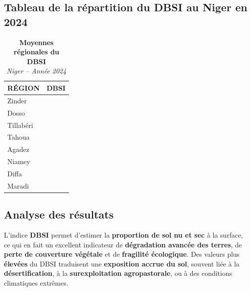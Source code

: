 \documentclass[
]{book}
\begin{document}
\subsection{Tableau de la répartition du DBSI au Niger en 2024}\label{tableau-de-la-ruxe9partition-du-dbsi-au-niger-en-2024}

\begin{table}[!t]
\caption*{
{\large \textbf{Moyennes régionales du DBSI}} \\ 
{\small \emph{Niger -- Année 2024}}
} 
\fontsize{12.0pt}{14.4pt}\selectfont
\begin{tabular*}{\linewidth}{@{\extracolsep{\fill}}lr}
\toprule
{RÉGION} & {DBSI} \\ 
\midrule\addlinespace[2.5pt]
Zinder & {\cellcolor[HTML]{FDC2AA}{\textcolor[HTML]{000000}{0.238}}} \\ 
Dosso & {\cellcolor[HTML]{DB2A24}{\textcolor[HTML]{FFFFFF}{0.273}}} \\ 
Tillabéri & {\cellcolor[HTML]{810511}{\textcolor[HTML]{FFFFFF}{0.292}}} \\ 
Tahoua & {\cellcolor[HTML]{D72622}{\textcolor[HTML]{FFFFFF}{0.274}}} \\ 
Agadez & {\cellcolor[HTML]{C0151B}{\textcolor[HTML]{FFFFFF}{0.280}}} \\ 
Niamey & {\cellcolor[HTML]{67000D}{\textcolor[HTML]{FFFFFF}{0.296}}} \\ 
Diffa & {\cellcolor[HTML]{FFF5F0}{\textcolor[HTML]{000000}{0.221}}} \\ 
Maradi & {\cellcolor[HTML]{FC7A59}{\textcolor[HTML]{FFFFFF}{0.255}}} \\ 
\bottomrule
\end{tabular*}
\end{table}

\subsection{Analyse des résultats}\label{analyse-des-ruxe9sultats-10}

L'indice \textbf{DBSI} permet d'estimer la \textbf{proportion de sol nu et sec} à la surface, ce qui en fait un excellent indicateur de \textbf{dégradation avancée des terres}, de \textbf{perte de couverture végétale} et de \textbf{fragilité écologique}. Des valeurs plus \textbf{élevées} du DBSI traduisent une \textbf{exposition accrue du sol}, souvent liée à la \textbf{désertification}, à la \textbf{surexploitation agropastorale}, ou à des conditions climatiques extrêmes.
\end{document}
